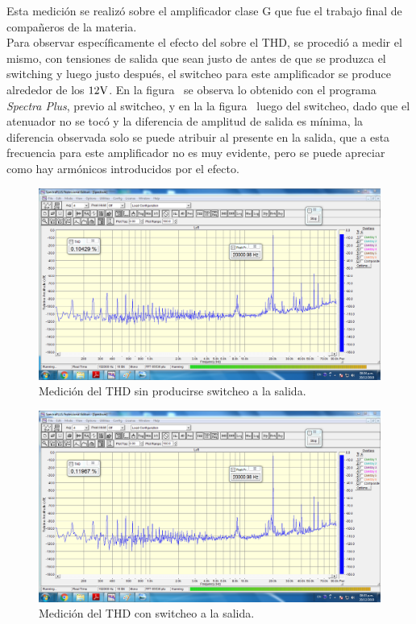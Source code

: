 Esta medición se realizó sobre el amplificador clase G que fue el trabajo final de compañeros de la materia.\\


Para observar específicamente el efecto del \textit{} sobre el THD, se procedió a medir el mismo, con tensiones de salida que sean justo de antes de que se produzca el switching y luego justo después, el switcheo para este amplificador se produce alrededor de los $12 \si[per-mode=symbol]{\volt}$. En la figura~ se observa lo obtenido con el programa \textit{Spectra Plus}, previo al switcheo, y en la la figura~ luego del switcheo, dado que el atenuador no se tocó y la diferencia de amplitud de salida es mínima, la diferencia observada solo se puede atribuir al \textit{} presente en la salida, que a esta frecuencia para este amplificador no es muy evidente, pero se puede apreciar como hay armónicos introducidos por el efecto.


\begin{figure}[H]
    \centering
    \includegraphics[width=0.95 \textwidth]{img/mediciones/THD/thd-20k-pre-18vpp.png}
    \caption{Medición del THD sin producirse switcheo a la salida.}
    \label{fig:THD_pre_switching}
\end{figure}


\vfill

\clearpage


\begin{figure}[H]
    \centering
    \includegraphics[width=0.95 \textwidth]{img/mediciones/THD/thd-20k-pos-25vpp.png}
    \caption{Medición del THD con switcheo a la salida.}
    \label{fig:THD_pos_switching}
\end{figure}


